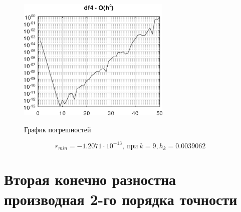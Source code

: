\documentclass{article}
\begin{document}
		\begin{figure}[h!] 
			\centering
			\renewcommand{\figurename}{Рисунок}
			\includegraphics [width=0.65\textwidth]{../img/df4}\\ 
			\caption{График погрешностей  \label{fig.3}}
		\end{figure}
		
		
		\[r_{min} = -1.2071\cdot 10^{-13},~ \text{при} ~ k=9, h_k=0.0039062\]
		\newpage
	
	\section{Вторая конечно разностна производная 2-го порядка точности}
	
\end{document}
